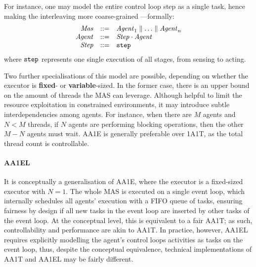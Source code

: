 For instance, 
one may model the entire control loop step as a single task,
hence making the interleaving more coarse-grained%
---formally:
%
\begin{equation*}
 \begin{array}{rcl}
   \V{mas} & \defeq & \V{agent}_1 \parallel \ldots \parallel \V{agent}_n \\
   \V{agent} & \defeq & \V{step} \cdot \V{agent} \\
   \V{step} & \defeq & \T{step} \\
 \end{array}
\end{equation*}
%
where $\T{step}$ represents one single execution of all stages, from sensing to acting.

Two further specialisations of this model are possible, 
depending on whether the executor is \textbf{fixed}- or \textbf{variable}-sized.
%
In the former case, 
there is an upper bound on the amount of threads the \ac{MAS} can leverage.
%
Although helpful to limit the resource exploitation in constrained environments,
it may introduce subtle interdependencies among agents.
%
For instance,
when there are $M$ agents and $N<M$ threads,
if $N$ agents are performing blocking operations,
then the other $M-N$ agents must wait.
%
%
\ac{AA1E} is generally
preferable over \ac{1A1T},
as the total thread count is controllable.

\paragraph{\ac{AA1EL}}

It is conceptually a generalisation of \ac{AA1E}, 
where the executor is a fixed-sized executor with $N = 1$.
%
The whole \ac{MAS} is executed on a single event loop,
which internally schedules all agents' execution with a FIFO queue of tasks,
ensuring fairness by design if all new tasks in the event loop are inserted by other tasks of the event loop.
%
At the conceptual level,
this is equivalent to a fair \ac{AA1T};
as such,
controllability and performance are akin to \ac{AA1T}.
%
In practice, however,
\ac{AA1EL} requires explicitly modelling the agent's control loops activities as tasks on the event loop,
thus, despite the conceptual equivalence,
technical implementations of \ac{AA1T} and \ac{AA1EL} may be fairly different.



